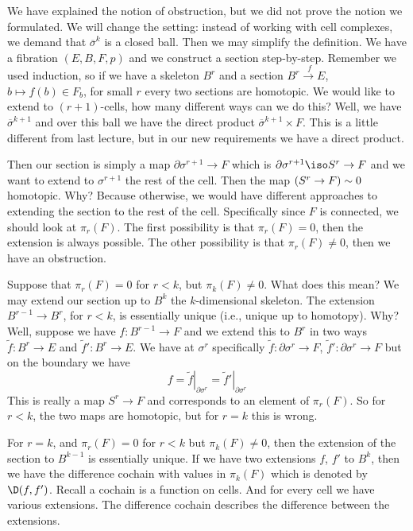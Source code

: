 We have explained the notion of obstruction, but we did not prove
the notion we formulated. We will change the setting: instead of
working with cell complexes, we demand that
$\overline{\sigma}^{k}$ is a closed ball. Then we may simplify
the definition. We have a fibration $(E,B,F,p)$ and we construct
a section step-by-step. Remember we used induction, so if we have
a skeleton $B^{r}$ and a section 
$B^{r}\xrightarrow{\;f}E$, $b\mapsto f(b)\in F_{b}$, for small $r$
every two sections are homotopic. We would like to extend to
$(r+1)$-cells, how many different ways can we do this? Well, we
have $\overline{\sigma}^{k+1}$ and over this ball we have the
direct product $\overline{\sigma}^{k+1}\times F$. This is a
little different from last lecture, but in our new requirements
we have a direct product.

Then our section is simply a map $\partial\sigma^{r+1}\to F$
which is $\partial\sigma^{r+1}\iso S^{r}\to F$ and we want to
extend to $\sigma^{r+1}$ the rest of the cell. Then the map
$(S^{r}\to F)\sim 0$ homotopic. Why? Because otherwise, we
would have different approaches to extending the section to the
rest of the cell. Specifically since $F$ is connected, we should
look at $\pi_{r}(F)$. The first possibility is that
$\pi_{r}(F)=0$, then the extension is always possible. The other
possibility is that $\pi_{r}(F)\not=0$, then we have an obstruction.

Suppose that $\pi_{r}(F)=0$ for $r<k$, but
$\pi_{k}(F)\not=0$. What does this mean? We may extend our
section up to $B^{k}$ the $k$-dimensional skeleton. The extension
$B^{r-1}\to B^{r}$, for $r<k$, is essentially unique (i.e., unique
up to homotopy).
Why? Well, suppose we have $f\colon B^{r-1}\to F$ and we extend
this to $B^{r}$ in two ways $\widetilde{f}\colon B^{r}\to E$ and
$\widetilde{f}'\colon B^{r}\to E$. We have at $\sigma^{r}$
specifically $\widetilde{f}\colon\partial\sigma^{r}\to F$,
$\widetilde{f}'\colon\partial\sigma^{r}\to F$ but on the boundary
we have
\begin{equation}
f = \left.\widetilde{f}\right|_{\partial\sigma^{r}}=\left.\widetilde{f}'\right|_{\partial\sigma^{r}}
\end{equation}
This is really a map $S^{r}\to F$ and corresponds to an element of
$\pi_{r}(F)$. So for $r<k$, the two maps are homotopic, but for
$r=k$ this is wrong.

For $r=k$, and $\pi_{r}(F)=0$ for $r<k$ but $\pi_{k}(F)\not=0$,
then the extension of the section to $B^{k-1}$ is essentially
unique. If we have two extensions $f$, $f'$ to $B^{k}$, then we
have the difference cochain with values in $\pi_{k}(F)$ which is
denoted by $\D(f,f')$. Recall a cochain is a function on
cells. And for every cell we have various extensions. The
difference cochain describes the difference between the
extensions.

